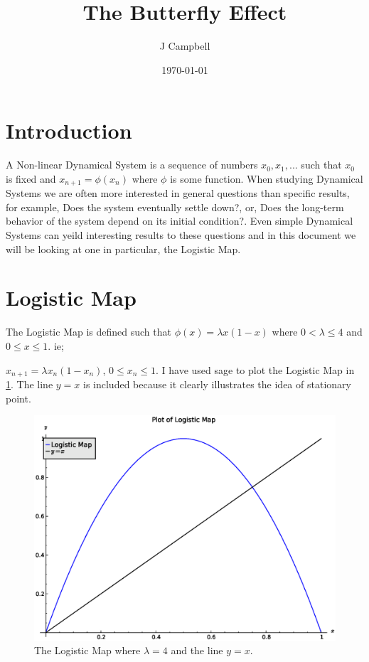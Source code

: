 \documentclass[a4paper]{article}
\title{The Butterfly Effect}
\author{J Campbell}
\date{\today}
\begin{document}

\maketitle

\section{Introduction}
A Non-linear Dynamical System is a sequence of numbers $x_0, x_1, ...$ such that $x_0$ is fixed and $x_{n+1} = \phi(x_n)$ where $\phi$ is some function. When studying Dynamical Systems we are often more interested in general questions than specific results, for example, Does the system eventually settle down?, or, Does the long-term behavior of the system depend on its initial condition?. Even simple Dynamical Systems can yeild interesting results to these questions and in this document we will be looking at one in particular, the Logistic Map.


\section{Logistic Map}
The Logistic Map is defined such that $\phi(x)=\lambda x(1-x)$ where $ 0 <\lambda \leq 4$ and $0\leq x\leq 1$. ie;

$x_{n+1} = \lambda x_n(1-x_n)$, $0 \leq x_n \leq 1 $. I have used sage to plot the Logistic Map in \ref{logisticmap}. The line $y=x$ is included because it clearly illustrates the idea of stationary point.
\begin{figure}[!htbp]
\begin{center}
\includegraphics[scale=0.4]{images/logisticmap}
\end{center}
\caption{The Logistic Map where $\lambda = 4$ and the line $y = x$.}
\label{logisticmap}
\end{figure}
\end{document}
